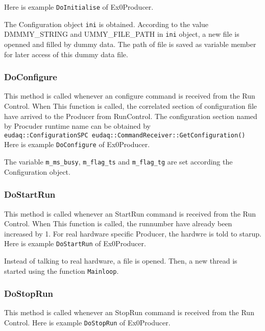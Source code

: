 Here is example \lstinline[style=cpp]{DoInitialise} of Ex0Producer.

The Configuration object \lstinline[style=cpp]{ini} is obtained. According to the value DMMMY\_STRING and UMMY\_FILE\_PATH in \lstinline[style=cpp]{ini} object, a new file is openned and filled by dummy data. The path of file is saved as variable member for later access of this dummy data file.

\subsubsection{DoConfigure}
This method is called whenever an configure command is received from the Run Control. When This function is called, the correlated section of configuration file have arrived to the Producer from RunControl. The configuration section named by Procuder runtime name can be obtained by \\
\lstinline[style=cpp]{eudaq::ConfigurationSPC eudaq::CommandReceiver::GetConfiguration()} \\

Here is example \lstinline[style=cpp]{DoConfigure} of Ex0Producer.

The variable \lstinline[style=cpp]{m_ms_busy}, \lstinline[style=cpp]{m_flag_ts} and \lstinline[style=cpp]{m_flag_tg} are set according the Configuration object.

\subsubsection{DoStartRun}\label{sec:ex0prdstart}
This method is called whenever an StartRun command is received from the Run Control. When This function is called, the runnumber have already been increased by 1. For real hardware specific Producer, the hardwre is told to starup.
Here is example \lstinline[style=cpp]{DoStartRun} of Ex0Producer.

Instead of talking to real hardware, a file is opened. Then, a new thread is started using the function \lstinline[style=cpp]{Mainloop}.

\subsubsection{DoStopRun}
This method is called whenever an StopRun command is received from the Run Control. Here is example \lstinline[style=cpp]{DoStopRun} of Ex0Producer.


